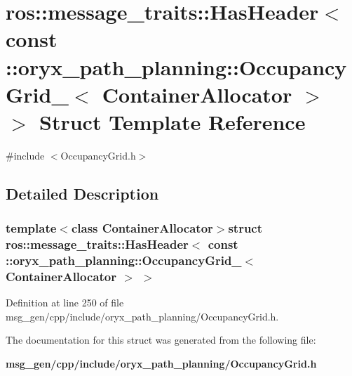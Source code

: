 \section{ros\-:\-:message\-\_\-traits\-:\-:\-Has\-Header$<$ const \-:\-:oryx\-\_\-path\-\_\-planning\-:\-:\-Occupancy\-Grid\-\_\-$<$ \-Container\-Allocator $>$ $>$ \-Struct \-Template \-Reference}
\label{structros_1_1message__traits_1_1HasHeader_3_01const_01_1_1oryx__path__planning_1_1OccupancyGrid_92926d5829d603cda857668ddfe92ade}


{\ttfamily \#include $<$\-Occupancy\-Grid.\-h$>$}



\subsection{\-Detailed \-Description}
\subsubsection*{template$<$class Container\-Allocator$>$struct ros\-::message\-\_\-traits\-::\-Has\-Header$<$ const \-::oryx\-\_\-path\-\_\-planning\-::\-Occupancy\-Grid\-\_\-$<$ Container\-Allocator $>$ $>$}



\-Definition at line 250 of file msg\-\_\-gen/cpp/include/oryx\-\_\-path\-\_\-planning/\-Occupancy\-Grid.\-h.



\-The documentation for this struct was generated from the following file\-:\begin{DoxyCompactItemize}
\item 
{\bf msg\-\_\-gen/cpp/include/oryx\-\_\-path\-\_\-planning/\-Occupancy\-Grid.\-h}\end{DoxyCompactItemize}
